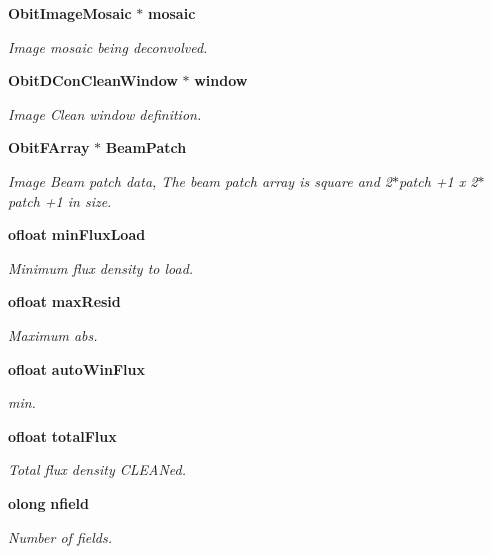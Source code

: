 \begin{CompactItemize}
{\bf Obit\-Image\-Mosaic} $\ast$ {\bf mosaic}
\begin{CompactList}\small\item\em Image mosaic being deconvolved. \item\end{CompactList}\item 
{\bf Obit\-DCon\-Clean\-Window} $\ast$ {\bf window}
\begin{CompactList}\small\item\em Image Clean window definition. \item\end{CompactList}\item 
{\bf Obit\-FArray} $\ast$ {\bf Beam\-Patch}
\begin{CompactList}\small\item\em Image Beam patch data, The beam patch array is square and 2$\ast$patch +1 x 2$\ast$patch +1 in size. \item\end{CompactList}\item 
{\bf ofloat} {\bf min\-Flux\-Load}
\begin{CompactList}\small\item\em Minimum flux density to load. \item\end{CompactList}\item 
{\bf ofloat} {\bf max\-Resid}
\begin{CompactList}\small\item\em Maximum abs. \item\end{CompactList}\item 
{\bf ofloat} {\bf auto\-Win\-Flux}
\begin{CompactList}\small\item\em min. \item\end{CompactList}\item 
{\bf ofloat} {\bf total\-Flux}
\begin{CompactList}\small\item\em Total flux density CLEANed. \item\end{CompactList}\item 
{\bf olong} {\bf nfield}
\begin{CompactList}\small\item\em Number of fields. \item\end{CompactList}\item 

\end{CompactItemize}
